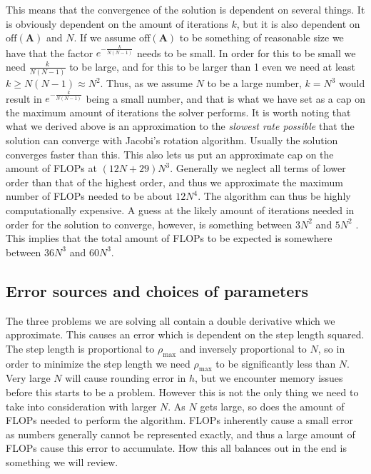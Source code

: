 \documentclass[reprint,english,notitlepage]{revtex4-1}  %
\begin{document}
This means that the convergence of the solution is dependent on several things. It is obviously dependent on the amount of iterations $k$, but it is also dependent on $\text{off}(\textbf{A})$ and $N$. If we assume $\text{off}(\textbf{A})$ to be something of reasonable size we have that the factor $e^{-\frac{k}{N(N-1)}}$ needs to be small. In order for this to be small we need $\frac{k}{N(N-1)}$ to be large, and for this to be larger than 1 even we need at least $k \geq N(N-1) \approx N^2$. Thus, as we assume $N$ to be a large number, $k = N^3$ would result in $e^{-\frac{k}{N(N-1)}}$ being a small number, and that is what we have set as a cap on the maximum amount of iterations the solver performs. It is worth noting that what we derived above is an approximation to the \textit{slowest rate possible} that the solution can converge with Jacobi's rotation algorithm. Usually the solution converges faster than this. This also lets us put an approximate cap on the amount of FLOPs at $(12N + 29)N^3$. Generally we neglect all terms of lower order than that of the highest order, and thus we approximate the maximum number of FLOPs needed to be about $12N^4$. The algorithm can thus be highly computationally expensive. A guess at the likely amount of iterations needed in order for the solution to converge, however, is something between $3N^2$ and $5N^2$ \citep{Hjorth-Jensen2015}. This implies that the total amount of FLOPs to be expected is somewhere between $36N^3$ and $60N^3$.  


\subsection{Error sources and choices of parameters} \label{sec:III:b}

The three problems we are solving all contain a double derivative which we approximate. This causes an error which is dependent on the step length squared. The step length is proportional to $\rho_\text{max}$ and inversely proportional to $N$, so in order to minimize the step length we need $\rho_\text{max}$ to be significantly less than $N$. Very large $N$ will cause rounding error in $h$, but we encounter memory issues before this starts to be a problem. However this is not the only thing we need to take into consideration with larger $N$. As $N$ gets large, so does the amount of FLOPs needed to perform the algorithm. FLOPs inherently cause a small error as numbers generally cannot be represented exactly, and thus a large amount of FLOPs cause this error to accumulate. How this all balances out in the end is something we will review.
\end{document}
